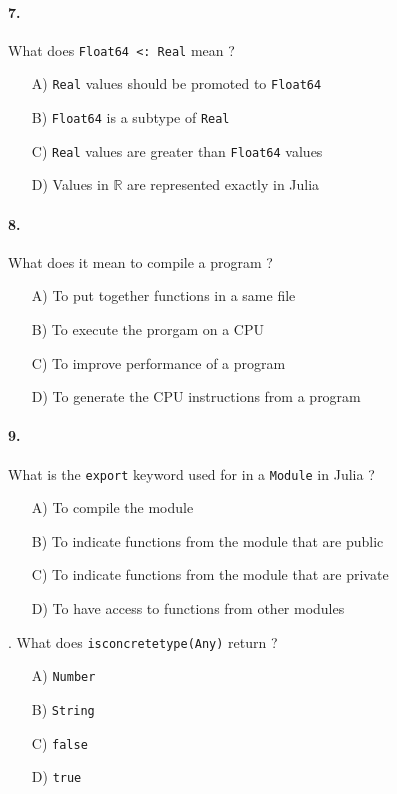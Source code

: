\documentclass{article}
\begin{document}
\medskip
\noindent
\paragraph{7.} What does \texttt{Float64 <: Real} mean ?
\begin{itemize}
    \item[A)] \texttt{Real} values should be promoted to \texttt{Float64}
    \item[B)] \texttt{Float64} is a subtype of \texttt{Real}
    \item[C)] \texttt{Real} values are greater than \texttt{Float64} values
    \item[D)] Values in $\mathbb{R}$ are represented exactly in Julia
\end{itemize}

\medskip
\noindent
\paragraph{8.} What does it mean to compile a program ?
\begin{itemize}
    \item[A)] To put together functions in a same file
    \item[B)] To execute the prorgam on a CPU
    \item[C)] To improve performance of a program
    \item[D)] To generate the CPU instructions from a program
\end{itemize}

\medskip
\noindent
\paragraph{9.} What is the \texttt{export} keyword used for in a \texttt{Module} in Julia ?
\begin{itemize}
    \item[A)] To compile the module
    \item[B)] To indicate functions from the module that are public
    \item[C)] To indicate functions from the module that are private
    \item[D)] To have access to functions from other modules
\end{itemize}

\medskip
{}. What does \texttt{isconcretetype(Any)} return ?
\begin{itemize}
    \item[A)] \texttt{Number}
    \item[B)] \texttt{String}
    \item[C)] \texttt{false}
    \item[D)] \texttt{true}
\end{itemize}
\end{document}

